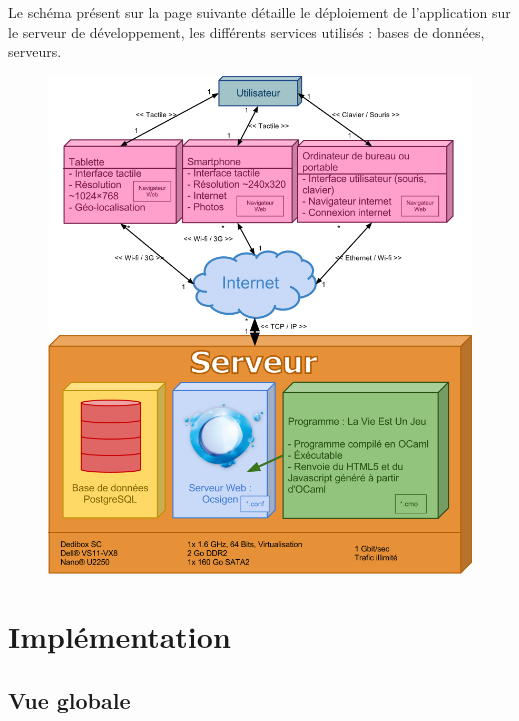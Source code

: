 \documentclass{life-fr}
\begin{document}
Le schéma présent sur la page suivante détaille le déploiement de l'application sur le serveur de développement, les différents services utilisés : bases de données, serveurs.

\newpage

\begin{figure}[H]
  \begin{center}
    \includegraphics[width=17cm]{img/deploiement.png}
  \end{center}
\end{figure}



\chapter{Implémentation}
\section{Vue globale}
\end{document}
